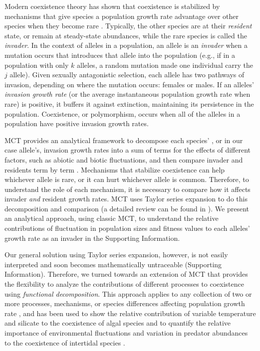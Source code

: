\documentclass[]{article}
\begin{document}
Modern coexistence theory has shown that coexistence is stabilized by mechanisms that give species a population growth rate advantage over other species when they become rare \citep{chesson_stabilizing_1982, chesson2003quantifying, barabas_chessons_2018}. Typically, the other species are at their \textit{resident} state, or remain at steady-state abundances, while the rare species is called the \textit{invader}. In the context of alleles in a population, an allele is an \textit{invader} when a mutation occurs that introduces that allele into the population (e.g., if in a population with only $k$ alleles, a random mutation made one individual carry the $j$ allele). Given sexually antagonistic selection, each allele has two pathways of invasion, depending on where the mutation occurs: females or males. If an alleles' \textit{invasion growth rate} (or the average instantaneous population growth rate when rare) is positive, it buffers it against extinction, maintaining its persistence in the population.  Coexistence, or polymorphism, occurs when all of the alleles in a population have positive invasion growth rates.

MCT provides an analytical framework to decompose each species' , or in our case allele's, invasion growth rates into a sum of terms for the effects of different factors, such as abiotic and biotic fluctuations, and then compare invader and residents term by term \citep{ellner_expanded_2019}. Mechanisms that stabilize coexistence can help whichever allele is rare, or it can hurt whichever allele is common. Therefore, to understand the role of each mechanism, it is necessary to compare how it affects invader \textit{and} resident growth rates. MCT uses Taylor series expansion to do this decomposition and comparison (a detailed review can be found in \citet{barabas_chessons_2018}). We present an analytical approach, using classic MCT, to understand the relative contributions of fluctuation in population sizes and fitness values to each alleles' growth rate as an invader in the Supporting Information.

Our general solution using Taylor series expansion, however, is not easily interpreted and soon becomes mathematically untraceable (Supporting Information). Therefore, we turned towards an extension of MCT \citep{ellner_expanded_2019} that provides the flexibility to analyze the contributions of different processes to coexistence using \textit{functional decomposition}. This approach applies to any collection of two or more processes, mechanisms, or species differences affecting population growth rate \citep{ ellner2016quantify, ellner_expanded_2019}, and has been used to show the relative contribution of variable temperature and silicate to the coexistence of algal species \citep{ellner2016quantify} and to quantify the relative importance of environmental fluctuations and variation in predator abundances to the coexistence of intertidal species \citep{shoemaker2020}.
\end{document}
